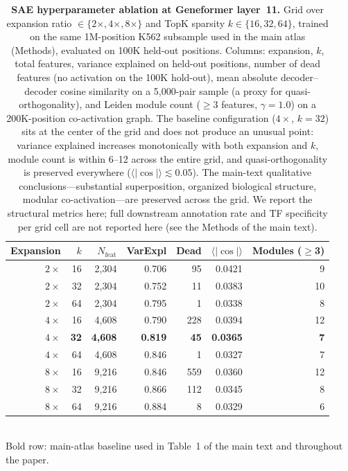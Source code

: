 \documentclass[11pt]{article}
\begin{document}
\begin{table}[H]
\centering
\caption{\textbf{SAE hyperparameter ablation at Geneformer layer~11.} Grid over expansion ratio $\in \{2\times, 4\times, 8\times\}$ and TopK sparsity $k \in \{16, 32, 64\}$, trained on the same 1M-position K562 subsample used in the main atlas (Methods), evaluated on 100K held-out positions. Columns: expansion, $k$, total features, variance explained on held-out positions, number of dead features (no activation on the 100K hold-out), mean absolute decoder--decoder cosine similarity on a 5{,}000-pair sample (a proxy for quasi-orthogonality), and Leiden module count ($\geq$3 features, $\gamma{=}1.0$) on a 200K-position co-activation graph. The baseline configuration ($4\times$, $k{=}32$) sits at the center of the grid and does not produce an unusual point: variance explained increases monotonically with both expansion and $k$, module count is within 6--12 across the entire grid, and quasi-orthogonality is preserved everywhere ($\langle|\cos|\rangle \lesssim 0.05$). The main-text qualitative conclusions---substantial superposition, organized biological structure, modular co-activation---are preserved across the grid. We report the structural metrics here; full downstream annotation rate and TF specificity per grid cell are not reported here (see the Methods of the main text).}
\label{tab:hyperparam}
\smallskip
\small
\begin{tabular}{rrrrrrr}
\toprule
Expansion & $k$ & $N_\text{feat}$ & VarExpl & Dead & $\langle|\cos|\rangle$ & Modules ($\geq$3) \\
\midrule
$2\times$ & 16 & 2{,}304 & 0.706 &  95 & 0.0421 &  9 \\
$2\times$ & 32 & 2{,}304 & 0.752 &  11 & 0.0383 & 10 \\
$2\times$ & 64 & 2{,}304 & 0.795 &   1 & 0.0338 &  8 \\
$4\times$ & 16 & 4{,}608 & 0.790 & 228 & 0.0394 & 12 \\
\textbf{$4\times$} & \textbf{32} & \textbf{4{,}608} & \textbf{0.819} & \textbf{45}  & \textbf{0.0365} & \textbf{7} \\
$4\times$ & 64 & 4{,}608 & 0.846 &   1 & 0.0327 &  7 \\
$8\times$ & 16 & 9{,}216 & 0.846 & 559 & 0.0360 & 12 \\
$8\times$ & 32 & 9{,}216 & 0.866 & 112 & 0.0345 &  8 \\
$8\times$ & 64 & 9{,}216 & 0.884 &   8 & 0.0329 &  6 \\
\bottomrule
\end{tabular}
\\[2pt]
\footnotesize Bold row: main-atlas baseline used in Table~1 of the main text and throughout the paper.
\end{table}
\end{document}
